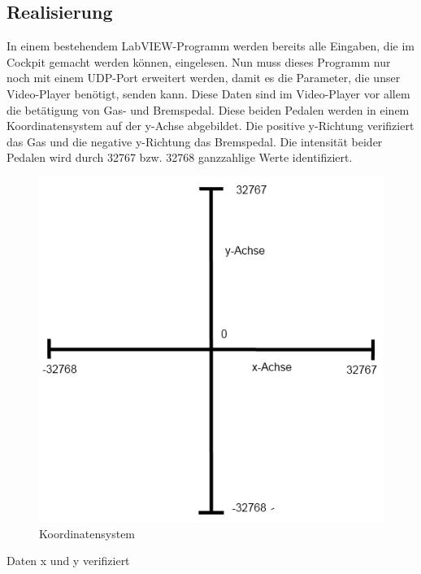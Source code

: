 \subsection{Realisierung}
In einem bestehendem LabVIEW-Programm werden bereits alle Eingaben, die im Cockpit gemacht werden können, eingelesen. Nun muss dieses Programm nur noch mit einem UDP-Port erweitert werden, damit es die Parameter, die unser Video-Player benötigt, senden kann. Diese Daten sind im Video-Player vor allem die betätigung von Gas- und Bremspedal. Diese beiden Pedalen werden in einem Koordinatensystem auf der y-Achse abgebildet. Die positive y-Richtung verifiziert das Gas und die negative y-Richtung das Bremspedal. Die intensität beider Pedalen wird durch 32767 bzw. 32768 ganzzahlige Werte identifiziert. 

\begin{figure}[H]
\centering 
\includegraphics{src/koordinatensystem.png}
\caption{Koordinatensystem} %
\label{Koordinatensystem} %
\end{figure}
Daten x und y verifiziert